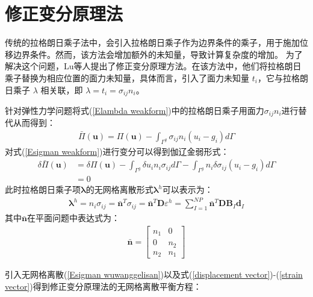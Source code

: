 \section{修正变分原理法}
传统的拉格朗日乘子法中，会引入拉格朗日乘子作为边界条件的乘子，用于施加位移边界条件。然而，该方法会增加额外的未知量，导致计算复杂度的增加。
为了解决这个问题，Lu等人\cite{}提出了修正变分原理方法。在该方法中，他们将拉格朗日乘子替换为相应位置的面力未知量，具体而言，引入了面力未知量 $t_i$，它与拉格朗日乘子 $\lambda$ 相关联，即 $\lambda = t_i = \sigma_{ij}n_i$。\par
针对弹性力学问题将式(\ref{Elambda weakform})中的拉格朗日乘子用面力$\sigma_{ij}n_i$进行替代从而得到：
\begin{equation}
\begin{split}\label{Esigman weakform}
    \bar{\Pi}(\pmb{u})=\Pi(\pmb{u})-\int_{\Gamma^g}\sigma_{ij}n_i(u_i-g_i)d\Gamma
\end{split}
\end{equation}
对式(\ref{Esigman weakform})进行变分可以得到伽辽金弱形式：
\begin{equation}
\begin{split}
    \delta\bar{\Pi}(\pmb{u})&=\delta\Pi(\pmb{u})-\int_{\Gamma^g}\delta u_in_i\sigma_{ij}d\Gamma-\int_{\Gamma^g}n_i\delta\sigma_{ij}(u_i-g_i)d\Gamma\\
    &=0
\end{split}
\end{equation}
此时拉格朗日乘子项$\pmb{\lambda}$的无网格离散形式$\pmb{\lambda}^h$可以表示为：
\begin{equation}\label{Esigman wuwanggelisan}
\begin{split}
    \pmb{\lambda}^h=n_i\sigma_{ij}=\bar{\pmb n}^T\sigma_{ij}=\bar{\pmb n}^T\pmb{D}\varepsilon^h=\sum_{I=1}^{N\!P}\bar{\pmb n}^T\pmb{D}\pmb{B}_I\pmb{d}_I
\end{split}
\end{equation}
其中$\bar{\pmb{n}}$在平面问题中表达式为：
\begin{equation}
\begin{split}
    \bar{\pmb n}=\left[\begin{matrix}n_1&0\\0&n_2\\n_2&n_1
    \end{matrix}\right]
\end{split}
\end{equation}\par
引入无网格离散(\ref{Esigman wuwanggelisan})以及式(\ref{displacement vector})-(\ref{strain vector})得到修正变分原理法的无网格离散平衡方程：
